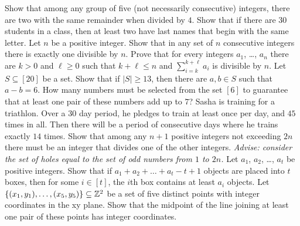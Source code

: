 \begin{exercises}
  \exercise Show that among any group of five (not necessarily consecutive)
    integers, there are two with the same remainder when divided by $4$.
  \exercise Show that if there are 30 students in a class, then at least
    two have last names that begin with the same letter.
  \exercise Let $n$ be a positive integer. Show that in any set of $n$
    consecutive integers there is exactly one divisible by $n$.
  \exercise Prove that for every integers $a_1$, \dots, $a_n$ there are
    $k > 0$ and $\ell \ge 0$ such that $k + \ell \le n$ and
    $\sum_{i = k}^{k + \ell} a_i$ is divisible by $n$.
  \exercise Let $S \subseteq [20]$ be a set. Show that if
    $|S| \ge 13$, then there are $a, b \in S$ such that $a - b = 6$.
  \exercise How many numbers must be selected from the set $[6]$ to
    guarantee that at least one pair of these numbers add up to $7$?
  \exercise Sasha is training for a triathlon. Over a $30$ day period, he
    pledges to train at least once per day, and $45$ times in all. Then there
    will be a period of consecutive days where he trains exactly $14$ times.
  \exercise Show that among any $n + 1$ positive integers not exceeding $2n$
    there must be an integer that divides one of the other integers.
    \emph{Advise: consider the set of holes equal to the set of odd numbers
    from $1$ to $2n$.}
  \exercise Let $a_1$, $a_2$, \dots, $a_t$ be positive integers. Show that
    if $a_1 + a_2 + \dots + a_t - t + 1$ objects are placed into $t$ boxes,
    then for some $i \in [t]$, the $i$th box contains at least $a_i$ objects.
  \exercise Let $\set{(x_1,y_1), \dots, (x_5, y_5)} \subseteq \Z^2$ be a
    set of five distinct points with integer coordinates in the xy plane. Show
    that the midpoint of the line joining at least one pair of these points has
    integer coordinates.
\end{exercises}
